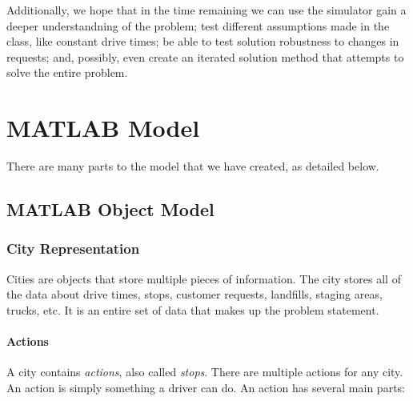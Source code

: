 \documentclass{article}
\begin{document}
Additionally, we hope that in the time remaining we can use the simulator gain a deeper understandning of the problem; test different assumptions made in the class, like constant drive times; be able to test solution robustness to changes in requests; and, possibly, even create an iterated solution method that attempts to solve the entire problem.

\section{MATLAB Model}

There are many parts to the model that we have created, as detailed below.

\subsection {MATLAB Object Model}


\subsubsection{City Representation}
Cities are objects that store multiple pieces of information. 
The city stores all of the data about drive times, stops, customer requests, landfills, staging areas, trucks, etc. 
It is an entire set of data that makes up the problem statement. 


\paragraph{Actions}
A city contains \emph{actions}, also called \emph{stops}.
There are multiple actions for any city.
An action is simply something a driver can do.
An action has several main parts:
\end{document}
